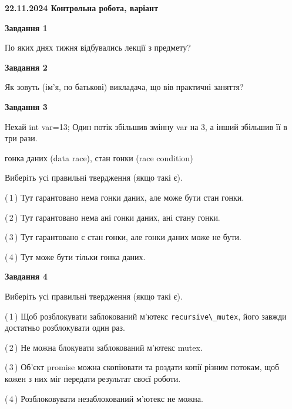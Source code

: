 \documentclass[12pt, ukrainian]{article}
\def\code#1{\Verb!#1!}
\begin{document}
\begin {large}

\textbf{22.11.2024 Контрольна робота, варіант  }\par


{

\begin{center}
\textbf{Завдання 1}
\end{center}

По яких днях тижня відбувались лекції з предмету?


\begin{center}
\textbf{Завдання 2}
\end{center}

Як зовуть (ім'я, по батькові) викладача, що вів практичні заняття?


\begin{center}
\textbf{Завдання 3}
\end{center}

Нехай int var=13; Один потік збільшив змінну var на 3, а інший збільшив її в три рази.

гонка даних (data race), стан гонки (race condition)

Виберіть усі правильні твердження (якщо такі є).\par
\vspace{2mm}
(\,1\,) Тут гарантовано нема гонки даних, але може бути стан гонки.%

(\,2\,) Тут гарантовано нема ані гонки даних, ані стану гонки.%

(\,3\,) Тут гарантовано є стан гонки, але гонки даних може не бути.%

(\,4\,) Тут може бути тільки гонка даних.%


\begin{center}
\textbf{Завдання 4}
\end{center}

Виберіть усі правильні твердження (якщо такі є).\par
\vspace{2mm}

(\,1\,) Щоб розблокувати заблокований м’ютекс \code{recursive\_mutex}, його завжди достатньо розблокувати один раз.%

(\,2\,) Не можна блокувати заблокований м’ютекс mutex.%

(\,3\,) Об’єкт promise можна скопіювати та роздати копії різним потокам, щоб кожен з них міг передати результат своєї роботи.%

(\,4\,) Розблоковувати незаблокований м’ютекс не можна.%


}
\end{large}
\end{document}
